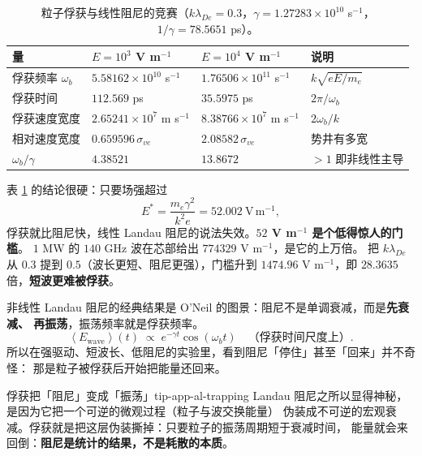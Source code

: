 \begin{table}[htbp]
\centering
\small
\caption{粒子俘获与线性阻尼的竞赛（$k\lambda_{De} = 0.3$，$\gamma = 1.27283\times10^{10}$ s$^{-1}$，$1/\gamma = 78.5651$ ps）。}
\label{tab:app-al-trapping}
\begin{tabular}{p{2.6cm}p{3.2cm}p{3.2cm}p{4.0cm}}
\toprule
量 & $E = 10^{3}$ V m$^{-1}$ & $E = 10^{4}$ V m$^{-1}$ & 说明 \\
\midrule
俘获频率 $\omega_b$ & $5.58162\times10^{10}$ s$^{-1}$ & $1.76506\times10^{11}$ s$^{-1}$ & $k\sqrt{eE/m_e}$ \\
俘获时间 & $112.569$ ps & $35.5975$ ps & $2\pi/\omega_b$ \\
俘获速度宽度 & $2.65241\times10^{7}$ m s$^{-1}$ & $8.38766\times10^{7}$ m s$^{-1}$ & $2\omega_b/k$ \\
相对速度宽度 & $0.659596\,\sigma_{ve}$ & $2.08582\,\sigma_{ve}$ & 势井有多宽 \\
$\omega_b/\gamma$ & $4.38521$ & $13.8672$ & $>1$ 即非线性主导 \\
\bottomrule
\end{tabular}

\end{table}

表 \ref{tab:app-al-trapping} 的结论很硬：只要场强超过
\begin{equation}
E^{*} = \frac{m_e\gamma^2}{k^2e} = 52.002\ \mathrm{V\,m^{-1}},
\label{eq:app-al-ecrit}
\end{equation}
俘获就比阻尼快，线性 Landau 阻尼的说法失效。\textbf{$52$ V m$^{-1}$ 是个低得惊人的门槛}。
$1$ MW 的 $140$ GHz 波在芯部给出 $774329$ V m$^{-1}$，是它的上万倍。
把 $k\lambda_{De}$ 从 $0.3$ 提到 $0.5$（波长更短、阻尼更强），门槛升到
$1474.96$ V m$^{-1}$，即 $28.3635$ 倍，\textbf{短波更难被俘获}。

非线性 Landau 阻尼的经典结果是 O'Neil 的图景：阻尼不是单调衰减，而是\textbf{先衰减、
再振荡}，振荡频率就是俘获频率。
\begin{equation}
\left\langle E_{\mathrm{wave}}\right\rangle(t)\;\propto\;e^{-\gamma t}\cos(\omega_bt)
\quad\text{（俘获时间尺度上）}.
\label{eq:app-al-oneil}
\end{equation}
所以在强驱动、短波长、低阻尼的实验里，看到阻尼「停住」甚至「回来」并不奇怪：
那是粒子被俘获后开始把能量还回来。

\begin{tip}{俘获把「阻尼」变成「振荡」}{tip-app-al-trapping}
Landau 阻尼之所以显得神秘，是因为它把一个可逆的微观过程（粒子与波交换能量）
伪装成不可逆的宏观衰减。俘获就是把这层伪装撕掉：只要粒子的振荡周期短于衰减时间，
能量就会来回倒：\textbf{阻尼是统计的结果，不是耗散的本质}。
\end{tip}

